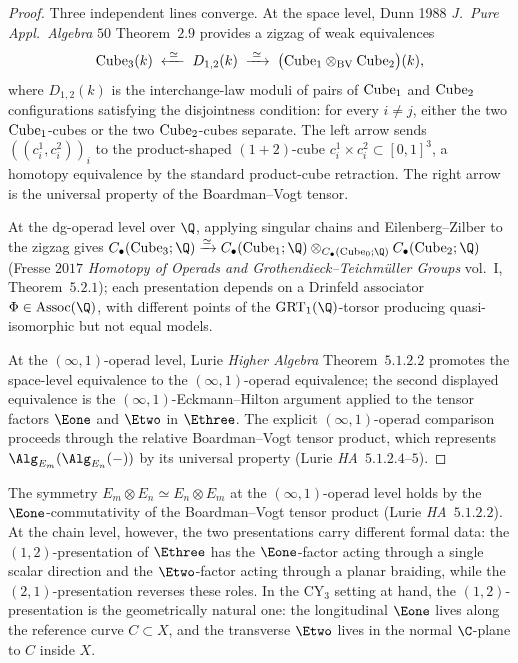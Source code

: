 \begin{proof}
Three independent lines converge. At the space level, Dunn 1988 \textit{J.~Pure Appl.~Algebra} $50$ Theorem~$2.9$ provides a zigzag of weak equivalences
\[
 \mathrm{Cube}_3(k) \;\xleftarrow{\;\simeq\;}\; D_{1,2}(k) \;\xrightarrow{\;\simeq\;}\; \bigl(\mathrm{Cube}_1 \otimes_{\mathrm{BV}} \mathrm{Cube}_2\bigr)(k),
\]
where $D_{1, 2}(k)$ is the interchange-law moduli of pairs of $\mathrm{Cube}_1$ and $\mathrm{Cube}_2$ configurations satisfying the disjointness condition: for every $i \neq j$, either the two $\mathrm{Cube}_1$-cubes or the two $\mathrm{Cube}_2$-cubes separate. The left arrow sends $((c_i^1, c_i^2))_i$ to the product-shaped $(1+2)$-cube $c_i^1 \times c_i^2 \subset [0, 1]^3$, a homotopy equivalence by the standard product-cube retraction. The right arrow is the universal property of the Boardman--Vogt tensor.

At the dg-operad level over $\Q$, applying singular chains and Eilenberg--Zilber to the zigzag gives $C_\bullet(\Cube_3; \Q) \xrightarrow{\simeq} C_\bullet(\Cube_1; \Q) \otimes_{C_\bullet(\Cube_0; \Q)} C_\bullet(\Cube_2; \Q)$ (Fresse $2017$ \textit{Homotopy of Operads and Grothendieck--Teichm\"uller Groups} vol.~I, Theorem~$5.2.1$); each presentation depends on a Drinfeld associator $\Phi \in \mathrm{Assoc}(\Q)$, with different points of the $\mathrm{GRT}_1(\Q)$-torsor producing quasi-isomorphic but not equal models.

At the $(\infty,1)$-operad level, Lurie \textit{Higher Algebra} Theorem~$5.1.2.2$ promotes the space-level equivalence to the $(\infty,1)$-operad equivalence; the second displayed equivalence is the $(\infty,1)$-Eckmann--Hilton argument applied to the tensor factors $\Eone$ and $\Etwo$ in $\Ethree$. The explicit $(\infty,1)$-operad comparison proceeds through the relative Boardman--Vogt tensor product, which represents $\Alg_{E_m}(\Alg_{E_n}(-))$ by its universal property (Lurie \textit{HA}~$5.1.2.4$--$5$).
\end{proof}

\begin{remark}
\label{rem:dunn-12-vs-21}
The symmetry $E_m \otimes E_n \simeq E_n \otimes E_m$ at the $(\infty,1)$-operad level holds by the $\Eone$-commutativity of the Boardman--Vogt tensor product (Lurie \textit{HA}~$5.1.2.2$). At the chain level, however, the two presentations carry different formal data: the $(1, 2)$-presentation of $\Ethree$ has the $\Eone$-factor acting through a single scalar direction and the $\Etwo$-factor acting through a planar braiding, while the $(2, 1)$-presentation reverses these roles. In the CY$_3$ setting at hand, the $(1, 2)$-presentation is the geometrically natural one: the longitudinal $\Eone$ lives along the reference curve $C \subset X$, and the transverse $\Etwo$ lives in the normal $\C$-plane to $C$ inside $X$.
\end{remark}

